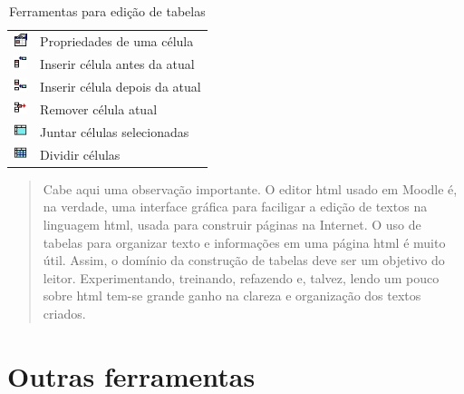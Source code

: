 \begin{table}
\begin{center}
\begin{tabular}{m{0.5cm} m{6.0cm}}
  \includegraphics[width=0.4cm]{imagem/cap0/cell-prop.jpg} & Propriedades de uma célula \\
  \includegraphics[width=0.4cm]{imagem/cap0/cell-insert-before.jpg} & Inserir célula antes da atual \\
  \includegraphics[width=0.4cm]{imagem/cap0/cell-insert-after.jpg} & Inserir célula depois da atual \\
  \includegraphics[width=0.4cm]{imagem/cap0/cell-delete.jpg} & Remover célula atual \\
  \includegraphics[width=0.4cm]{imagem/cap0/cell-merge.jpg} & Juntar células selecionadas \\
  \includegraphics[width=0.4cm]{imagem/cap0/cell-split.jpg} & Dividir células \\ \hline
 \end{tabular}
\caption{Ferramentas para edição de tabelas}
\end{center}
\end{table}

\begin{quotation}
 Cabe aqui uma observação importante. O editor html usado em Moodle é, na verdade, uma interface gráfica para faciligar a edição de textos na linguagem html, usada para construir páginas na Internet. O uso de tabelas para organizar texto e informações em uma página html é muito útil. Assim, o domínio da construção de tabelas deve ser um objetivo do leitor. Experimentando, treinando, refazendo e, talvez, lendo um pouco sobre html tem-se grande ganho na clareza e organização dos textos criados.
\end{quotation}

\section{Outras ferramentas}

